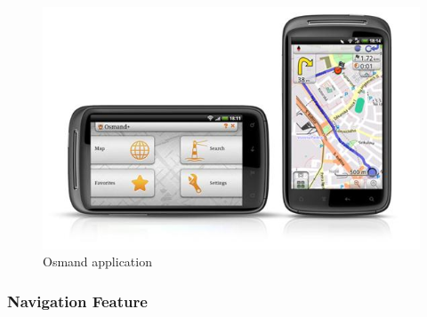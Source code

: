 \documentclass[a4paper,12pt, notitlepage, oneside, onecolumn]{article}
\begin{document}
\begin{figure}[H]
\begin{minipage}[b]{1.0\linewidth}
\centering
\includegraphics[scale=0.6]{osmand.jpg}
\caption{Osmand application}
\label{fig:osmand}
\end{minipage}
\centering
\end{figure}


\subsubsection{Navigation Feature}
\end{document}
